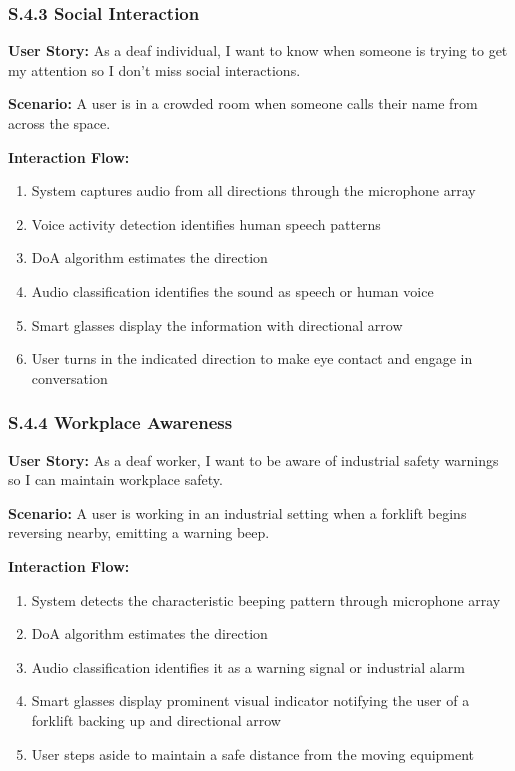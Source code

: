 \documentclass[12pt]{article}
\theoremstyle{definition}
\begin{document}
\subsubsection{S.4.3 Social Interaction}
\textbf{User Story:} As a deaf individual, I want to know when someone is trying
to get my attention so I don't miss social interactions.

\textbf{Scenario:} A user is in a crowded room when someone calls their name
from across the space.

\textbf{Interaction Flow:}
\begin{enumerate}
    \item System captures audio from all directions through the microphone array
    \item Voice activity detection identifies human speech patterns
    \item DoA algorithm estimates the direction
    \item Audio classification identifies the sound as speech or human voice
    \item Smart glasses display the information with directional arrow
    \item User turns in the indicated direction to make eye contact and engage
    in conversation
\end{enumerate}

\subsubsection{S.4.4 Workplace Awareness}
\textbf{User Story:} As a deaf worker, I want to be aware of industrial safety
warnings so I can maintain workplace safety.

\textbf{Scenario:} A user is working in an industrial setting when a forklift
begins reversing nearby, emitting a warning beep.

\textbf{Interaction Flow:}
\begin{enumerate}
    \item System detects the characteristic beeping pattern through microphone
    array
    \item DoA algorithm estimates the direction
    \item Audio classification identifies it as a warning signal or industrial
    alarm
    \item Smart glasses display prominent visual indicator notifying the user of
    a forklift backing up and directional arrow
    \item User steps aside to maintain a safe distance from the moving equipment
\end{enumerate}
\end{document}
